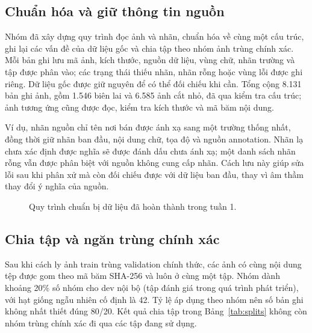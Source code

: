 \documentclass[11pt,a4paper]{article}
\begin{document}
\subsection{Chuẩn hóa và giữ thông tin nguồn}
Nhóm đã xây dựng quy trình đọc ảnh và nhãn, chuẩn hóa về cùng một cấu trúc, ghi lại các vấn đề của dữ liệu gốc và chia tập theo nhóm ảnh trùng chính xác. Mỗi bản ghi lưu mã ảnh, kích thước, nguồn dữ liệu, vùng chữ, nhãn trường và tập được phân vào; các trạng thái thiếu nhãn, nhãn rỗng hoặc vùng lỗi được ghi riêng. Dữ liệu gốc được giữ nguyên để có thể đối chiếu khi cần. Tổng cộng 8.131 bản ghi ảnh, gồm 1.546 biên lai và 6.585 ảnh cắt nhỏ, đã qua kiểm tra cấu trúc; ảnh tương ứng cũng được đọc, kiểm tra kích thước và mã băm nội dung.

Ví dụ, nhãn nguồn chỉ tên nơi bán được ánh xạ sang một trường thống nhất, đồng thời giữ nhãn ban đầu, nội dung chữ, tọa độ và nguồn annotation. Nhãn lạ chưa xác định được nghĩa sẽ được đánh dấu chưa ánh xạ; một danh sách nhãn rỗng vẫn được phân biệt với nguồn không cung cấp nhãn. Cách lưu này giúp sửa lỗi sau khi phân xử mà còn đối chiếu được với dữ liệu ban đầu, thay vì âm thầm thay đổi ý nghĩa của nguồn.

\begin{figure}[!htbp]
\centering
{}
\caption{Quy trình chuẩn bị dữ liệu đã hoàn thành trong tuần 1.}\label{fig:pipeline}
\end{figure}

\subsection{Chia tập và ngăn trùng chính xác}
Sau khi cách ly ảnh train trùng validation chính thức, các ảnh có cùng nội dung tệp được gom theo mã băm SHA-256 và luôn ở cùng một tập. Nhóm dành khoảng 20\% số nhóm cho dev nội bộ (tập đánh giá trong quá trình phát triển), với hạt giống ngẫu nhiên cố định là 42. Tỷ lệ áp dụng theo nhóm nên số bản ghi không nhất thiết đúng 80/20. Kết quả chia tập trong Bảng~\ref{tab:splits} không còn nhóm trùng chính xác đi qua các tập đang sử dụng.
\end{document}
